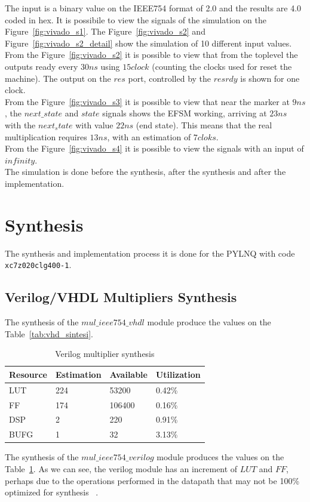 \documentclass[]{IEEEtran}
\begin{document}
The input is a binary value on the IEEE754 format of 2.0 and the results are 4.0 coded in hex. It is possibile to view the signals of the simulation on the Figure~\ref{fig:vivado_s1}. The Figure~\ref{fig:vivado_s2} and Figure~\ref{fig:vivado_s2_detail} show the simulation of 10 different input values.
\\

From the Figure~\ref{fig:vivado_s2} it is possible to view that from the toplevel the outputs ready every $30ns$ using $15 clock$ (counting the clocks used for reset the machine). The output on the $res$ port, controlled by the $resrdy$ is shown for one clock.
\\

From the Figure~\ref{fig:vivado_s3} it is possible to view that near the marker at $9ns$, the $next\_state$ and $state$ signals shows the EFSM working, arriving at $23ns$ with the $next_state$ with value $22ns$ (end state). This means that the real multiplication requires $13ns$, with an estimation of $7cloks$.
\\

From the Figure~\ref{fig:vivado_s4} it is possible to view the signals with an input of $infinity$.
\\

The simulation is done before the synthesis, after the synthesis and after the implementation.

	\section{Synthesis}
	\label{sec:synthesis}

The synthesis and implementation process it is done for the PYLNQ with code \verb|xc7z020clg400-1|.

\subsection{Verilog/VHDL Multipliers Synthesis}
	The synthesis of the $mul\_ieee754\_vhdl$ module produce the values on the Table~\ref{tab:vhd_sintesi}.
	\begin{table}[]
	\centering
		\begin{tabular}{@{}llll@{}}
			\toprule
			Resource & Estimation & Available & Utilization \\ \midrule
			LUT      & 224        & 53200     & 0.42\%      \\
			FF       & 174        & 106400    & 0.16\%      \\
			DSP      & 2          & 220       & 0.91\%      \\
			BUFG     & 1          & 32        & 3.13\%      \\ \bottomrule
		\end{tabular}
	\caption{Verilog multiplier synthesis}
	\label{tab:verilog_sintesi}
	\end{table}
The synthesis of the $mul\_ieee754\_verilog$ module produces the values on the Table~\ref{tab:verilog_sintesi}. 
As we can see, the verilog module has an increment of $LUT$ and $FF$, perhaps due to the operations performed in the datapath that may not be 100\% optimized for synthesis ~\cite{sintesitut}.
\end{document}
